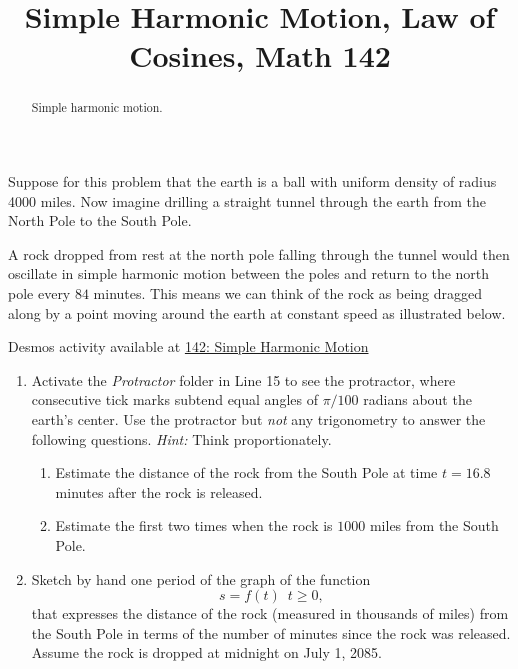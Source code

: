\documentclass{ximera}
\title{Simple Harmonic Motion, Law of Cosines, Math 142}
\begin{document}
\begin{abstract}
Simple harmonic motion.
\end{abstract}
\maketitle

\begin{question}  \label{QKLKLddfgkghg}
Suppose for this problem that the earth is a ball with uniform density of radius 4000 miles. Now imagine drilling a straight tunnel through the earth from the North Pole to the South Pole. 

A rock dropped from rest at the north pole falling through the tunnel would then oscillate in simple harmonic motion between the poles and return to the north pole every $84$ minutes. This means we can think of the rock as being dragged along by a point moving around the earth at constant speed as illustrated below. 

\begin{onlineOnly}
    \begin{center}
\end{center}
\end{onlineOnly}

Desmos activity available at \href{https://www.desmos.com/calculator/ij8dqowgza}{142: Simple Harmonic Motion}

\begin{enumerate}

\item Activate the \emph{Protractor} folder in Line 15 to see the protractor, where consecutive tick marks subtend equal angles of $\pi/100$ radians about the earth's center. Use the protractor but \emph{not} any trigonometry to answer the following questions. \emph{Hint:} Think proportionately.

\begin{enumerate}
\item Estimate the distance of the rock from the South Pole at time $t=16.8$ minutes after the rock is released.

\item Estimate the first two times when the rock is $1000$ miles from the South Pole.
\end{enumerate} 

\item Sketch by hand one period of the graph of the function
\[
 s = f(t) \, \, \, t\geq 0 ,
\]
that expresses the distance of the rock (measured in thousands of miles) from the South Pole in terms of the number of minutes since the rock was released. Assume the rock is dropped at midnight on July 1, 2085.


\end{enumerate}
\end{question}
\end{document}
